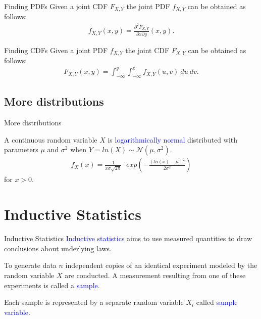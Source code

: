 \documentclass{beamer}
\def\padding{\vspace{0.5cm}}
\def\b{\textcolor{blue}}
\begin{document}
\begin{frame}
    \begin{block}{Finding PDFs}
        Given a joint CDF $F_{X,Y}$ the joint PDF $f_{X,Y}$ can be obtained as follows:
        \begin{align*}
            f_{X,Y}(x,y) = \frac{\partial^2 F_{X,Y}}{\partial x \partial y}(x,y).
        \end{align*}
    \end{block}\pause\par\padding
    \begin{block}{Finding CDFs}
        Given a joint PDF $f_{X,Y}$ the joint CDF $F_{X,Y}$ can be obtained as follows:
        \begin{align*}
            F_{X,Y}(x,y) = \int_{- \infty}^y \int_{- \infty}^x f_{X,Y}(u,v)\ du\ dv.
        \end{align*}
    \end{block}
\end{frame}

\subsection{More distributions}
\begin{frame}{More distributions}
    \begin{definition}
        A continuous random variable $X$ is \b{logarithmically normal} distributed with parameters $\mu$ and $\sigma^2$ when $Y = ln(X) \sim \mathcal{N}(\mu, \sigma^2)$.\pause
        \begin{align*}
            f_X(x) = \frac{1}{x \sigma \sqrt{2 \pi}} \cdot exp\left(-\frac{(ln(x) - \mu)^2}{2 \sigma^2}\right)
        \end{align*} for $x > 0$.
    \end{definition}
\end{frame}

\section{Inductive Statistics}
\begin{frame}{Inductive Statistics}
    \b{Inductive statistics} aims to use measured quantities to draw conclusions about underlying laws.\pause\par
    To generate data $n$ independent copies of an identical experiment modeled by the random variable $X$ are conducted. A measurement resulting from one of these experiments is called a \b{sample}.\pause\par
    Each sample is represented by a separate random variable $X_i$ called \b{sample variable}.
\end{frame}
\end{document}
